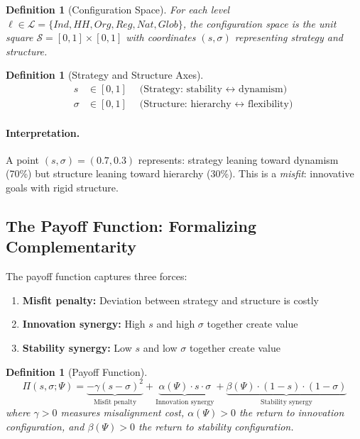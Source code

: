 \documentclass[12pt,a4paper]{article}
\newtheorem{definition}[theorem]{Definition}
\begin{document}
\begin{definition}[Configuration Space]
For each level $\ell \in \mathcal{L} = \{Ind, HH, Org, Reg, Nat, Glob\}$,
the configuration space is the unit square $\mathcal{S} = [0,1] \times [0,1]$
with coordinates $(s, \sigma)$ representing strategy and structure.
\end{definition}

\begin{definition}[Strategy and Structure Axes]
\begin{align}
  s &\in [0,1] \quad \text{(Strategy: stability $\leftrightarrow$ dynamism)} \\
  \sigma &\in [0,1] \quad \text{(Structure: hierarchy $\leftrightarrow$ flexibility)}
\end{align}
\end{definition}

\paragraph{Interpretation.}
A point $(s, \sigma) = (0.7, 0.3)$ represents:
strategy leaning toward dynamism (70\%) but structure leaning toward hierarchy (30\%).
This is a \emph{misfit}: innovative goals with rigid structure.

\subsection{The Payoff Function: Formalizing Complementarity}

The payoff function captures three forces:
\begin{enumerate}
  \item \textbf{Misfit penalty:} Deviation between strategy and structure is costly
  \item \textbf{Innovation synergy:} High $s$ and high $\sigma$ together create value
  \item \textbf{Stability synergy:} Low $s$ and low $\sigma$ together create value
\end{enumerate}

\begin{definition}[Payoff Function]
\begin{equation}
  \Pi(s, \sigma; \Psi) = \underbrace{-\gamma (s - \sigma)^2}_{\text{Misfit penalty}}
                        + \underbrace{\alpha(\Psi) \cdot s \cdot \sigma}_{\text{Innovation synergy}}
                        + \underbrace{\beta(\Psi) \cdot (1-s) \cdot (1-\sigma)}_{\text{Stability synergy}}
  \label{eq:payoff}
\end{equation}
where $\gamma > 0$ measures misalignment cost, $\alpha(\Psi) > 0$ the return to innovation configuration,
and $\beta(\Psi) > 0$ the return to stability configuration.
\end{definition}
\end{document}
